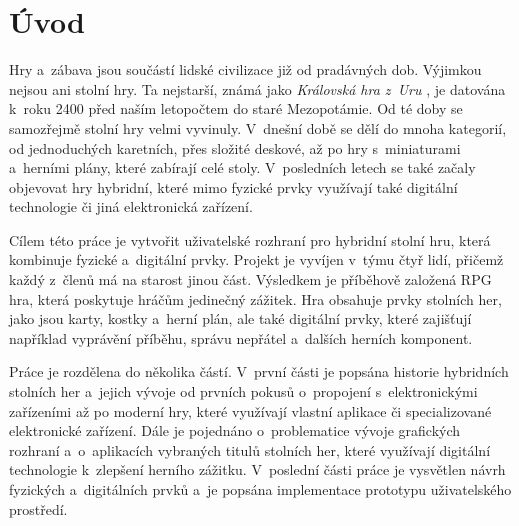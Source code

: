 \chapter{Úvod}
Hry a~zábava jsou součástí lidské civilizace již od pradávných dob. Výjimkou nejsou ani stolní hry. Ta nejstarší, známá jako \textit{Královská hra z~Uru} \cite{royal_game_of_ur}, je datována k~roku 2400 před naším letopočtem do staré Mezopotámie. Od té doby se samozřejmě stolní hry velmi vyvinuly. V~dnešní době se dělí do mnoha kategorií, od jednoduchých karetních, přes složité deskové, až po hry s~miniaturami a~herními plány, které zabírají celé stoly. V~posledních letech se také začaly objevovat hry hybridní, které mimo fyzické prvky využívají také digitální technologie či jiná elektronická zařízení.

Cílem této práce je vytvořit uživatelské rozhraní pro hybridní stolní hru, která kombinuje fyzické a~digitální prvky. Projekt je vyvíjen v~týmu čtyř lidí, přičemž každý z~členů má na starost jinou část. Výsledkem je příběhově založená RPG hra, která poskytuje hráčům jedinečný zážitek. Hra obsahuje prvky stolních her, jako jsou karty, kostky a~herní plán, ale také digitální prvky, které zajišťují například vyprávění příběhu, správu nepřátel a~dalších herních komponent.

Práce je rozdělena do několika částí. V~první části je popsána historie hybridních stolních her a~jejich vývoje od prvních pokusů o~propojení s~elektronickými zařízeními až po moderní hry, které využívají vlastní aplikace či specializované elektronické zařízení. Dále je pojednáno o~problematice vývoje grafických rozhraní a~o~aplikacích vybraných titulů stolních her, které využívají digitální technologie k~zlepšení herního zážitku. V~poslední části práce je vysvětlen návrh fyzických a~digitálních prvků a~je popsána implementace prototypu uživatelského prostředí.